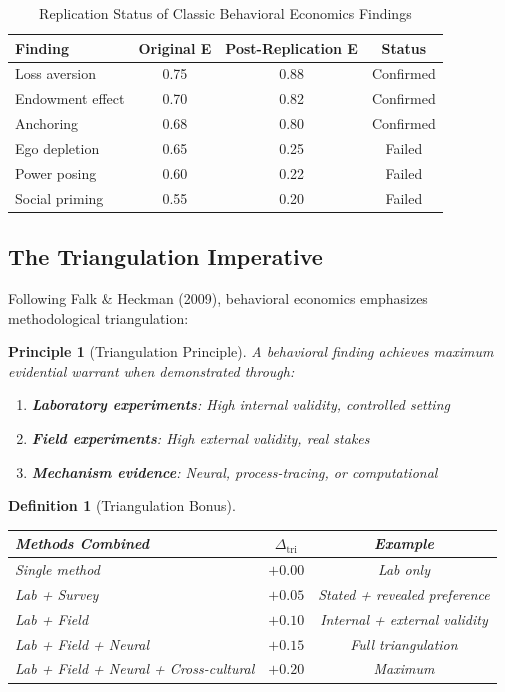 \documentclass[11pt,a4paper]{article}
\newtheorem{definition}{Definition}[section]
\newtheorem{principle}{Principle}[section]
\theoremstyle{remark}
\begin{document}
\begin{table}[h]
\centering
\caption{Replication Status of Classic Behavioral Economics Findings}
\label{tab:be-replication}
\begin{tabular}{lccc}
\toprule
\textbf{Finding} & \textbf{Original E} & \textbf{Post-Replication E} & \textbf{Status} \\
\midrule
Loss aversion & 0.75 & 0.88 & Confirmed \\
Endowment effect & 0.70 & 0.82 & Confirmed \\
Anchoring & 0.68 & 0.80 & Confirmed \\
Ego depletion & 0.65 & 0.25 & Failed \\
Power posing & 0.60 & 0.22 & Failed \\
Social priming & 0.55 & 0.20 & Failed \\
\bottomrule
\end{tabular}
\end{table}

\subsection{The Triangulation Imperative}

Following Falk \& Heckman (2009), behavioral economics emphasizes methodological triangulation:

\begin{principle}[Triangulation Principle]
\label{princ:triangulation}
A behavioral finding achieves maximum evidential warrant when demonstrated through:
\begin{enumerate}
    \item \textbf{Laboratory experiments}: High internal validity, controlled setting
    \item \textbf{Field experiments}: High external validity, real stakes
    \item \textbf{Mechanism evidence}: Neural, process-tracing, or computational
\end{enumerate}
\end{principle}

\begin{definition}[Triangulation Bonus]
\label{def:tri-bonus}
\begin{center}
\begin{tabular}{lcc}
\toprule
\textbf{Methods Combined} & $\Delta_{\text{tri}}$ & \textbf{Example} \\
\midrule
Single method & $+0.00$ & Lab only \\
Lab + Survey & $+0.05$ & Stated + revealed preference \\
Lab + Field & $+0.10$ & Internal + external validity \\
Lab + Field + Neural & $+0.15$ & Full triangulation \\
Lab + Field + Neural + Cross-cultural & $+0.20$ & Maximum \\
\bottomrule
\end{tabular}
\end{center}
\end{definition}
\end{document}
